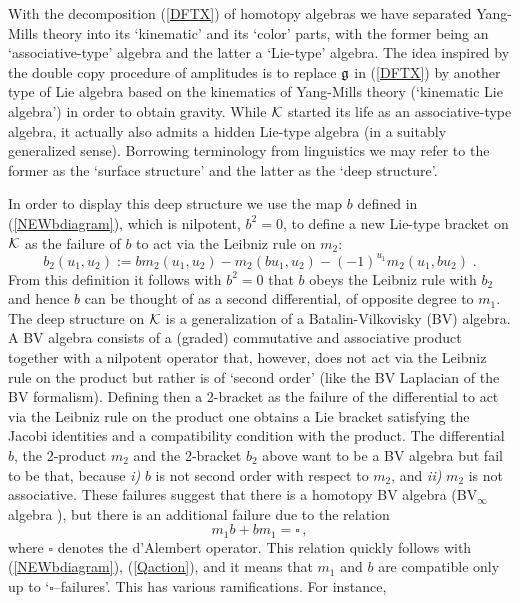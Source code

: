\documentclass[12pt]{article}\pdfoutput=1
\def\B{\square}
\def\be{\begin{equation}}
\def\ee{\end{equation}}
\begin{document}
With the decomposition (\ref{DFTX}) of homotopy algebras we have separated Yang-Mills theory into its `kinematic' 
and its `color' parts, with the former being an `associative-type' algebra and the latter a `Lie-type' algebra. 
The idea inspired by the double copy procedure of amplitudes is to replace $\frak{g}$ 
in (\ref{DFTX}) by another type of Lie algebra 
based on the kinematics  of Yang-Mills theory (`kinematic Lie algebra') in order to obtain gravity. 
While ${\cal K}$ started its life as an associative-type algebra, it actually also admits a hidden Lie-type algebra 
(in a suitably generalized sense). 
Borrowing terminology from linguistics we may refer to the former as the `surface structure' and the latter as 
the `deep structure'. 


In order to display this deep structure we use  the map $b$ defined in (\ref{NEWbdiagram}), 
which is nilpotent, $b^2=0$, to define a new Lie-type bracket  on ${\cal K}$ 
as the failure of $b$ to act via the Leibniz rule on $m_2$: 
\begin{equation}\label{b2}
b_2(u_1,u_2):=bm_2(u_1,u_2)-m_2(bu_1,u_2)-(-1)^{u_1}m_2(u_1,bu_2)\;.    
\end{equation}
From this definition it follows with $b^2=0$  that $b$ obeys the Leibniz rule 
with $b_2$ and hence $b$ can be thought of as a second differential, of opposite degree to $m_1$.  
The deep structure on ${\cal K}$ is a generalization of a Batalin-Vilkovisky (BV) algebra. 
A BV algebra consists of a (graded) commutative and associative product together with a nilpotent operator 
that, however, does not act via the Leibniz rule on the product but rather  is of `second order' (like the BV Laplacian 
of the BV formalism).  
Defining then a 2-bracket as the failure of the 
differential to act via the Leibniz rule on the product  one obtains a Lie bracket satisfying the Jacobi identities 
and a compatibility condition with the product. The differential $b$, the 2-product $m_2$ and the 
2-bracket $b_2$  above want to be  a BV algebra but fail to be that, because \textit{i)}  $b$ is {not} second order with respect to $m_2$,
and \textit{ii)}  $m_2$ is {not} associative. These failures suggest that there is a  homotopy BV algebra 
(BV$_{\infty}$ algebra \cite{CarrilloVallette}), 
but there is an additional failure due to the relation 
 \be\label{FirstBoxFailure} 
  m_1 b+ b m_1 = \B\,, 
 \ee
where $\B$ denotes the d'Alembert operator.  
This relation quickly follows  with (\ref{NEWbdiagram}), (\ref{Qaction}), and it 
means  that $m_1$ and $b$  are compatible 
only  up to `$\B$--failures'. This has various ramifications. For instance,  
\end{document}
